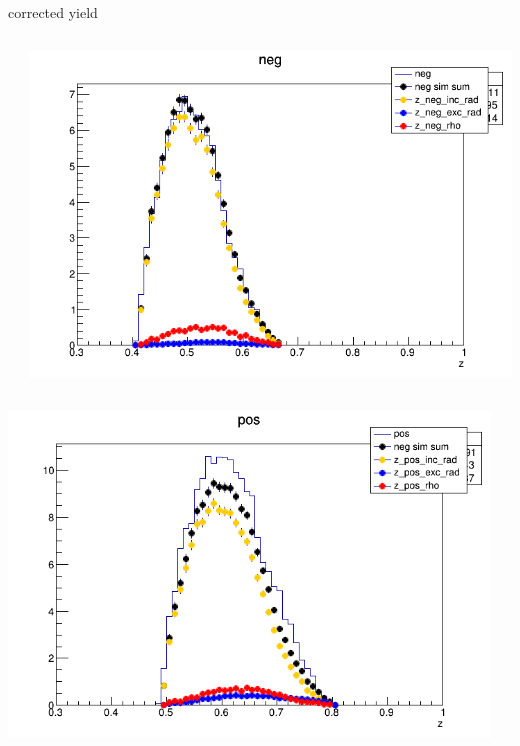 \begin{frame}{corrected yield}
\begin{columns}
\begin{column}[T]{0.25\textwidth}
\end{column}
\begin{column}[T]{0.25\textwidth}
\includegraphics[width = \textwidth]{results/yield/statistics_corr/yield_x_Q2_z_0.55_4.764_0.50_neg.png}
\end{column}
\end{columns}
\begin{columns}
\begin{column}[T]{0.25\textwidth}
\includegraphics[width = \textwidth]{results/yield/statistics_corr/yield_x_Q2_z_0.55_4.764_0.60_pos.png}
\end{column}
\begin{column}[T]{0.25\textwidth}

\end{column}
\end{columns}
\end{frame}
